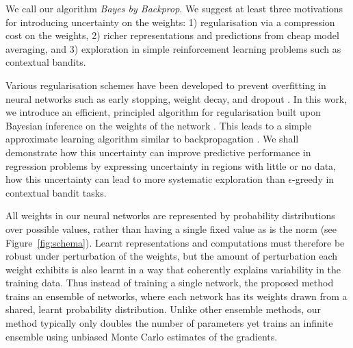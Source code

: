 We call our algorithm \emph{Bayes by Backprop}.
We suggest at least three motivations for introducing uncertainty on
the weights: 1) regularisation via a compression cost on the weights, 2) richer
representations and predictions from cheap model averaging, and 3) exploration
in simple reinforcement learning problems such as contextual bandits. 

Various regularisation schemes have been developed to prevent overfitting in neural networks
such as early stopping, weight decay, and dropout \citep{hinton_dropout_2012}.
In this work, we introduce an efficient, principled algorithm for regularisation built upon Bayesian inference on
the weights of the network \citep{mackay_practical_1992,buntine_bayesian_1991,mackay_probable_1995}.
This leads to a simple approximate learning
algorithm similar to backpropagation \citep{lecun_procedure_1985,
rumelhart1988learning}.
We shall demonstrate how this uncertainty can improve predictive
performance in regression problems by expressing uncertainty in regions with little or no data,
how this uncertainty can lead to more systematic exploration
than $\epsilon$-greedy in contextual bandit tasks.

All weights in our neural networks are represented by probability distributions
over possible values, rather than having a single fixed value as is the norm (see Figure~\ref{fig:schema}).
Learnt representations and computations must therefore be robust under
perturbation of the weights, but the amount of perturbation each weight exhibits is
also learnt in a way that coherently explains variability in the training data.
Thus instead of training a single network, the proposed method trains an ensemble of networks,
where each network has its weights drawn from a shared, learnt probability distribution.
Unlike other ensemble methods, our method typically only doubles the number of parameters
yet trains an infinite ensemble using unbiased Monte Carlo estimates of
the gradients.

